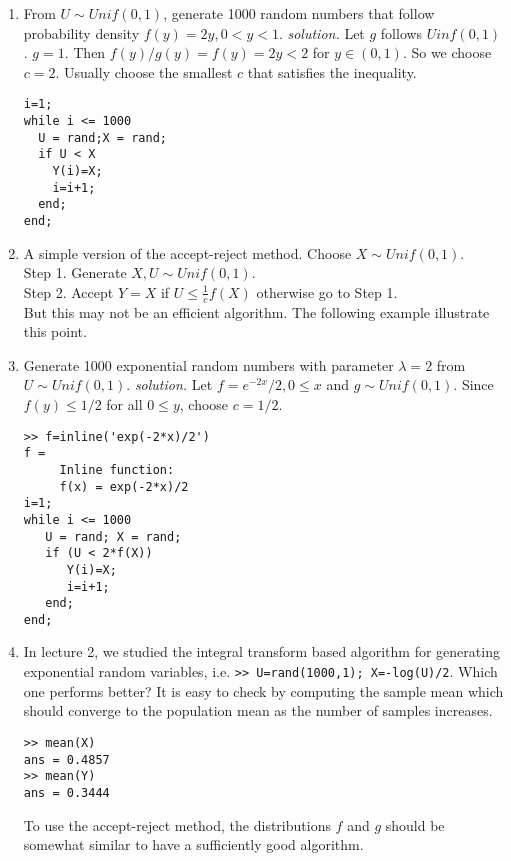 \documentclass[11pt,twocolumn]{article} %
\begin{document}
\begin{enumerate}
\item From $U \sim Unif(0,1)$, generate 1000 random numbers that
follow probability density $f(y) = 2y, 0 < y < 1$. {\em solution.}
Let $g$ follows $Uinf(0,1)$. $g=1$. Then $f(y)/g(y)=f(y) = 2y < 2$
for $y \in (0,1)$. So we choose $c=2$. Usually choose the smallest
$c$ that satisfies the inequality.
\begin{verbatim}
i=1; 
while i <= 1000
  U = rand;X = rand;
  if U < X
    Y(i)=X;
    i=i+1;
  end;
end;
\end{verbatim}
\item A simple version of the accept-reject method. Choose $X \sim
Unif(0,1)$.\\
Step 1. Generate $X, U \sim Unif(0,1)$.\\
Step 2. Accept $Y = X$ if $U \leq \frac{1}{c}f(X)$ otherwise go
to Step 1.\\
But this may not be an efficient algorithm. The following example
illustrate this point.
\item Generate 1000 exponential random numbers with parameter
$\lambda=2$ from $U\sim Unif(0,1)$. {\em solution.} Let
$f=e^{-2x}/2, 0 \leq x$ and $g \sim Unif(0,1)$. Since $f(y) \leq
1/2$ for all $0 \leq y$, choose $c=1/2$.
\begin{verbatim}
>> f=inline('exp(-2*x)/2')
f =
     Inline function:
     f(x) = exp(-2*x)/2
i=1; 
while i <= 1000 
   U = rand; X = rand; 
   if (U < 2*f(X)) 
      Y(i)=X;
      i=i+1; 
   end; 
end;
\end{verbatim}
\item In lecture 2, we studied the integral transform based
algorithm for generating exponential random variables, i.e.
{\tt >> U=rand(1000,1); X=-log(U)/2}.
Which one performs better? It is easy to check by computing the
sample mean which should converge to the population mean as the
number of samples increases.
\begin{verbatim}
>> mean(X)
ans = 0.4857
>> mean(Y)
ans = 0.3444
\end{verbatim}
To use the accept-reject method, the distributions $f$ and $g$
should be somewhat similar to have a sufficiently good algorithm.

\end{enumerate}
\end{document}
